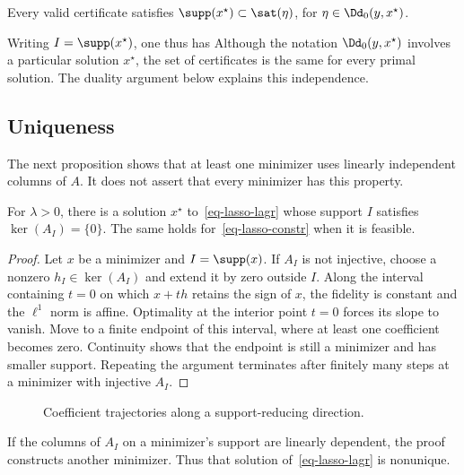 Every valid certificate satisfies $\supp(x^\star) \subset \sat(\eta)$, for $\eta\in \Dd_0(y,x^\star)$.

Writing $I=\supp(x^\star)$, one thus has
Although the notation $\Dd_0(y,x^\star)$ involves a particular solution $x^\star$, the set of certificates is the same for every primal solution. The duality argument below explains this independence.

\subsection{Uniqueness}

The next proposition shows that at least one minimizer uses linearly independent columns of $A$. It does not assert that every minimizer has this property.

\begin{prop}
	For $\lambda>0$, there is a solution $x^\star$ to~\eqref{eq-lasso-lagr} whose support $I$ satisfies $\ker(A_I)=\{0\}$. The same holds for~\eqref{eq-lasso-constr} when it is feasible.
\end{prop}

\begin{proof}
Let $x$ be a minimizer and $I=\supp(x)$. If $A_I$ is not injective, choose a nonzero $h_I\in\ker(A_I)$ and extend it by zero outside $I$. Along the interval containing $t=0$ on which $x+th$ retains the sign of $x$, the fidelity is constant and the $\ell^1$ norm is affine. Optimality at the interior point $t=0$ forces its slope to vanish. Move to a finite endpoint of this interval, where at least one coefficient becomes zero. Continuity shows that the endpoint is still a minimizer and has smaller support. Repeating the argument terminates after finitely many steps at a minimizer with injective $A_I$.
\end{proof}

\begin{figure}[tbp]
\centering
{}
\caption{Coefficient trajectories along a support-reducing direction.}
\label{fig-review-sparse-theory-injectivity}
\end{figure}
%
If the columns of $A_I$ on a minimizer's support are linearly dependent, the proof constructs another minimizer. Thus that solution of~\eqref{eq-lasso-lagr} is nonunique.

